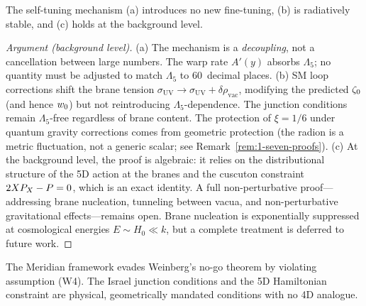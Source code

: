 \begin{claim}
\label{thm:1-rigidity}
The self-tuning mechanism (a) introduces no new fine-tuning, (b) is radiatively stable, and (c) holds at the background level.
\end{claim}

\begin{proof}[Argument (background level)]
(a) The mechanism is a \emph{decoupling}, not a cancellation between large numbers. The warp rate $A'(y)$ absorbs $\Lambda_5$; no quantity must be adjusted to match $\Lambda_5$ to 60~decimal places.
(b) SM loop corrections shift the brane tension $\sigma_\mathrm{UV} \to \sigma_\mathrm{UV} + \delta\rho_\mathrm{vac}$, modifying the predicted $\zeta_0$ (and hence $w_0$) but not reintroducing $\Lambda_5$-dependence. The junction conditions remain $\Lambda_5$-free regardless of brane content. The protection of $\xi = 1/6$ under quantum gravity corrections comes from geometric protection (the radion is a metric fluctuation, not a generic scalar; see Remark~\ref{rem:1-seven-proofs}).
(c) At the background level, the proof is algebraic: it relies on the distributional structure of the 5D action at the branes and the cuscuton constraint $2XP_X - P = 0$, which is an exact identity. A full non-perturbative proof---addressing brane nucleation, tunneling between vacua, and non-perturbative gravitational effects---remains open. Brane nucleation is exponentially suppressed at cosmological energies $E \sim H_0 \ll k$, but a complete treatment is deferred to future work. \qedhere
\end{proof}

\begin{proposition}
\label{thm:1-weinberg-evasion}
The Meridian framework evades Weinberg's no-go theorem by violating assumption (W4). The Israel junction conditions and the 5D Hamiltonian constraint are physical, geometrically mandated conditions with no 4D analogue.
\end{proposition}


